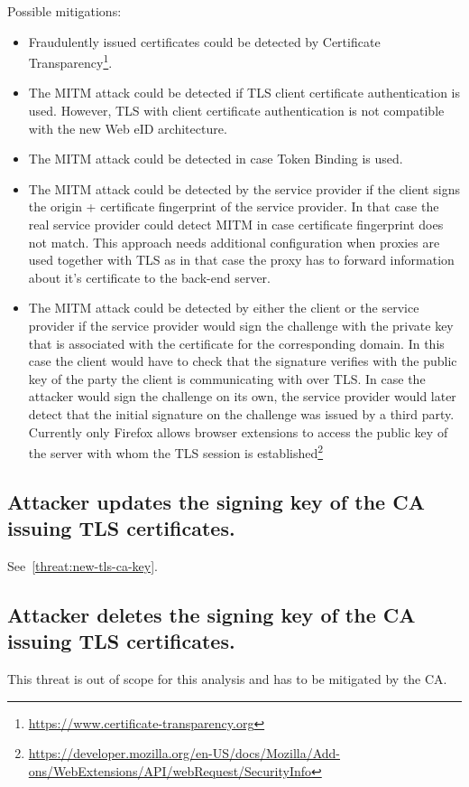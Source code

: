 Possible mitigations:
\begin{itemize}
\item Fraudulently issued certificates could be detected by Certificate Transparency\footnote{\url{https://www.certificate-transparency.org}}.

\item The MITM attack could be detected if TLS client certificate authentication is used. However, TLS with client certificate authentication is not compatible with the new Web eID architecture.

\item The MITM attack could be detected in case Token Binding is used.

\item The MITM attack could be detected by the service provider if the client signs the origin + certificate fingerprint of the service provider. In that case the real service provider could detect MITM in case certificate fingerprint does not match. This approach needs additional configuration when proxies are used together with TLS as in that case the proxy has to forward information about it's certificate to the back-end server.

\item The MITM attack could be detected by either the client or the service provider if the service provider would sign the challenge with the private key that is associated with the certificate for the corresponding domain. In this case the client would have to check that the signature verifies with the public key of the party the client is communicating with over TLS. In case the attacker would sign the challenge on its own, the service provider would later detect that the initial signature on the challenge was issued by a third party. Currently only Firefox allows browser extensions to access the public key of the server with whom the TLS session is established\footnote{\url{https://developer.mozilla.org/en-US/docs/Mozilla/Add-ons/WebExtensions/API/webRequest/SecurityInfo}}
\end{itemize}


\subsection{Attacker updates the signing key of the CA issuing TLS certificates.}
See~\ref{threat:new-tls-ca-key}.

\subsection{Attacker deletes the signing key of the CA issuing TLS certificates.}
This threat is out of scope for this analysis and has to be mitigated by the CA.


